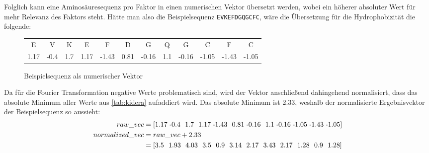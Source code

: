         \newpage
        Folglich kann eine Aminosäuresequenz pro Faktor in einen numerischen Vektor übersetzt werden, wobei ein höherer absoluter Wert für mehr Relevanz des Faktors steht. Hätte man also die Beispielsequenz \texttt{EVKEFDGQGCFC}, wäre die Übersetzung für die Hydrophobizität die folgende:

        \begin{figure}[H]
            \centering
            \begin{tabular}{cccccccccccc}
                E & V & K & E & F & D & G & Q & G & C & F & C\\
                1.17 & -0.4 & 1.7 & 1.17 & -1.43 & 0.81 & -0.16 & 1.1 & -0.16 & -1.05 & -1.43 & -1.05
            \end{tabular}
            \caption{Beispielsequenz als numerischer Vektor}
            \label{fig:kidera_example}
        \end{figure}

        Da für die Fourier Transformation negative Werte problematisch sind, wird der Vektor anschließend dahingehend normalisiert, dass das absolute Minimum aller Werte aus \autoref{tab:kidera} aufaddiert wird. Das absolute Minimum ist 2.33, weshalb der normalisierte Ergebnisvektor der Beispielsequenz so aussieht:
        \begin{equation}
            \label{equ:normalization}
            \begin{split}
                raw\_vec & = [1.17\ \sminus0.4\ \ 1.7\ \ 1.17\ \sminus1.43\ \ 0.81\ \sminus0.16\ \ 1.1\ \sminus0.16\ \sminus1.05\ \sminus1.43\ \sminus1.05]\\
                normalized\_vec & = raw\_vec + 2.33\\
                 & = [3.5\ \ 1.93\ \ 4.03\ \ 3.5\ \ 0.9\ \ 3.14\ \ 2.17\ \ 3.43\ \ 2.17\ \ 1.28\ \ 0.9\ \ 1.28]
            \end{split}
        \end{equation}

